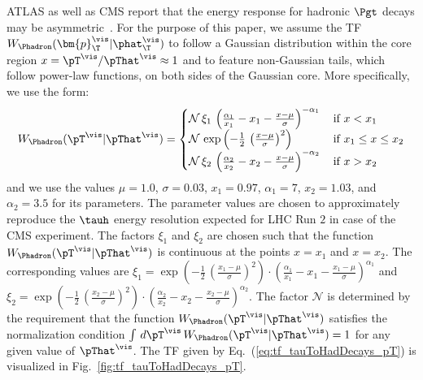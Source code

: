 ATLAS as well as CMS report that the energy response for hadronic
$\Pgt$ decays may be asymmetric~\cite{ATLAS:2011tfa,PRF-14-001}.
For the purpose of this paper, we assume the TF $W_{\Phadron}( \bm{p}_{\T}^{\vis} | \phat_{\T}^{\vis} )$ 
to follow a Gaussian distribution within the core region $x = \pT^{\vis}/\pThat^{\vis} \approx 1$ and to feature non-Gaussian tails,
which follow power-law functions, on both sides of the Gaussian core.
More specifically, we use the form:
\begin{equation}
W_{\Phadron}( \pT^{\vis} | \pThat^{\vis} ) = 
 \begin{cases}
   \mathcal{N} \, \xi_{1} \, \left( \frac{\alpha_{1}}{x_{1}} - x_{1} - \frac{x - \mu}{\sigma} \right)^{-\alpha_{1}} \,  
 & \mbox{if } x < x_{1} \\
   \mathcal{N} \, \exp\left( -\frac{1}{2} \, \left( \frac{x - \mu}{\sigma} \right)^{2} \right) \,
 & \mbox{if } x_{1} \leq x \leq x_{2} \\
   \mathcal{N} \, \xi_{2} \, \left( \frac{\alpha_{2}}{x_{2}} - x_{2} - \frac{x - \mu}{\sigma} \right)^{-\alpha_{2}} \,
 & \mbox{if } x > x_{2} 
 \end{cases}
\label{eq:tf_tauToHadDecays_pT}
\end{equation}
and we use the values $\mu = 1.0$, $\sigma = 0.03$, $x_{1} = 0.97$, $\alpha_{1} = 7$,
$x_{2} = 1.03$, and $\alpha_{2} = 3.5$ for its parameters.
The parameter values are chosen to approximately reproduce the $\tauh$ energy resolution expected for LHC Run $2$ in case of the CMS experiment.
The factors $\xi_{1}$ and $\xi_{2}$ are chosen such that the
function $W_{\Phadron}( \pT^{\vis} | \pThat^{\vis} )$ is continuous at
the points $x = x_{1}$ and $x = x_{2}$. 
The corresponding values are 
$\xi_{1} = \exp\left( -\frac{1}{2} \, \left( \frac{x_{1} - \mu}{\sigma} \right)^{2} \right) \cdot \left( \frac{\alpha_{1}}{x_{1}} - x_{1} - \frac{x_{1} - \mu}{\sigma} \right)^{\alpha_{1}}$
and
$\xi_{2} = \exp\left( -\frac{1}{2} \, \left( \frac{x_{2} - \mu}{\sigma} \right)^{2} \right) \cdot \left( \frac{\alpha_{2}}{x_{2}} - x_{2} - \frac{x_{2} - \mu}{\sigma} \right)^{\alpha_{2}}$.
The factor $\mathcal{N}$ is determined by the requirement that the function $W_{\Phadron}( \pT^{\vis} | \pThat^{\vis} )$ 
satisfies the normalization condition $\int \, d\pT^{\vis} \, W_{\Phadron}( \pT^{\vis} | \pThat^{\vis} ) = 1$ for any given value of $\pThat^{\vis}$.
The TF given by Eq.~(\ref{eq:tf_tauToHadDecays_pT}) is visualized in Fig.~\ref{fig:tf_tauToHadDecays_pT}.


